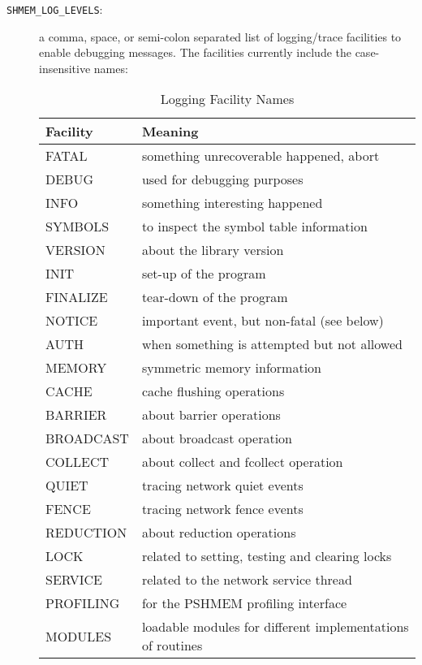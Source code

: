 \begin{description}
\item[{\texttt{SHMEM\_LOG\_LEVELS}:}] a comma, space, or semi-colon separated
  list of logging/trace facilities to enable debugging messages. The
  facilities currently include the case-insensitive names:
  
  \begin{table}[!h]
    \begin{center}
      \caption{Logging Facility Names}
      \begin{tabular}{|l|l|}
        \hline 
        Facility & Meaning\tabularnewline
        \hline
        \hline 
        FATAL & something unrecoverable happened, abort\tabularnewline
        \hline

        DEBUG & used for debugging purposes\tabularnewline
        \hline
        INFO & something interesting happened\tabularnewline
        \hline
        SYMBOLS & to inspect the symbol table information\tabularnewline
        \hline
        VERSION & about the library version\tabularnewline
        \hline

        INIT & set-up of the program\tabularnewline
        \hline
        FINALIZE & tear-down of the program\tabularnewline
        \hline
        NOTICE & important event, but non-fatal (see below)\tabularnewline
        \hline
        AUTH & when something is attempted but not allowed\tabularnewline
        \hline
        MEMORY & symmetric memory information\tabularnewline
        \hline
        CACHE & cache flushing operations\tabularnewline
        \hline
        BARRIER & about barrier operations\tabularnewline
        \hline
        BROADCAST & about broadcast operation\tabularnewline
        \hline
        COLLECT & about collect and fcollect operation\tabularnewline
        \hline
        QUIET & tracing network quiet events\tabularnewline
        \hline
        FENCE & tracing network fence events\tabularnewline
        \hline
        REDUCTION & about reduction operations\tabularnewline
        \hline
        LOCK & related to setting, testing and clearing locks\tabularnewline
        \hline
        SERVICE & related to the network service thread\tabularnewline
        \hline
        PROFILING & for the PSHMEM profiling interface\tabularnewline
        \hline
        MODULES & loadable modules for different implementations of routines\tabularnewline
        \hline
      \end{tabular}
    \end{center}
  \end{table}


\end{description}
